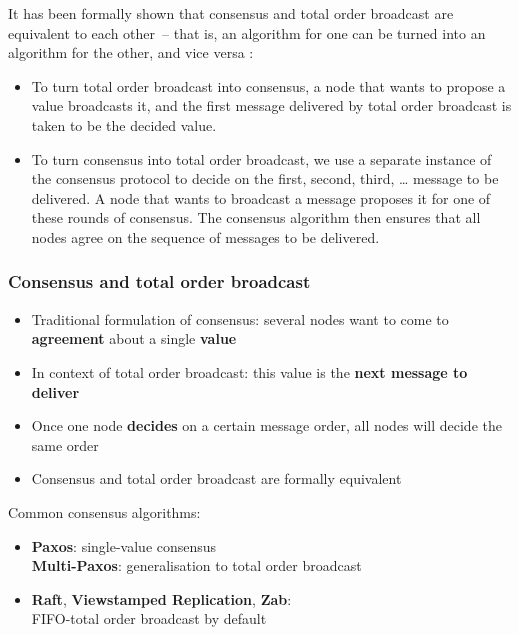 It has been formally shown that consensus and total order broadcast are equivalent to each other~-- that is, an algorithm for one can be turned into an algorithm for the other, and vice versa \citep{Chandra:1996}:
\begin{itemize}
    \item To turn total order broadcast into consensus, a node that wants to propose a value broadcasts it, and the first message delivered by total order broadcast is taken to be the decided value.
    \item To turn consensus into total order broadcast, we use a separate instance of the consensus protocol to decide on the first, second, third, {\dots} message to be delivered.
        A node that wants to broadcast a message proposes it for one of these rounds of consensus.
        The consensus algorithm then ensures that all nodes agree on the sequence of messages to be delivered.
\end{itemize}

\begin{frame}
    \label{s:consensus-intro}
    \frametitle{Consensus and total order broadcast}
    \begin{itemize}
        \item Traditional formulation of consensus: several nodes want to come to \textbf{agreement} about a single \textbf{value}\pause
        \item In context of total order broadcast: this value is the \textbf{next message to deliver}\pause
        \item Once one node \textbf{decides} on a certain message order, all nodes will decide the same order\pause
        \item Consensus and total order broadcast are formally equivalent\pause
    \end{itemize}
    Common consensus algorithms:
    \begin{itemize}
        \item \textbf{Paxos}: single-value consensus\\
            \textbf{Multi-Paxos}: generalisation to total order broadcast\pause
        \item \textbf{Raft}, \textbf{Viewstamped Replication}, \textbf{Zab}:\\
            FIFO-total order broadcast by default
    \end{itemize}
\end{frame}
\label{l:consensus-intro}

